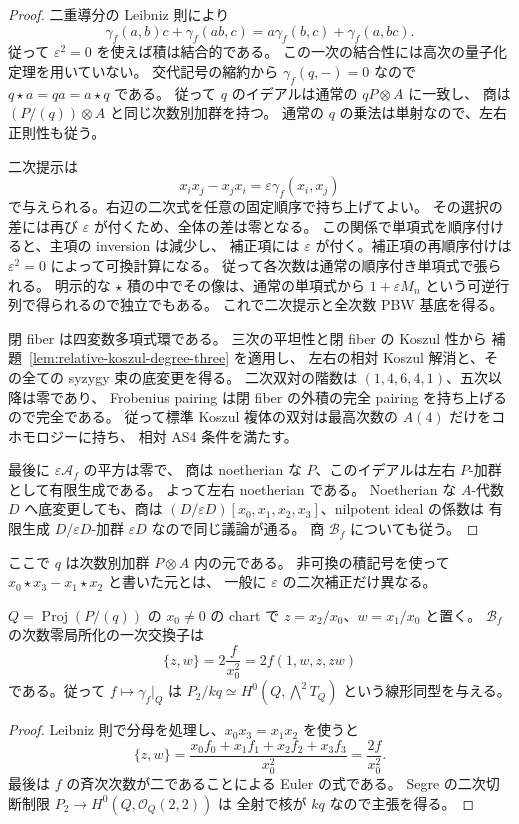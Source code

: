 \begin{proof}
二重導分の Leibniz 則により
\[
 \gamma_f(a,b)c+\gamma_f(ab,c)
 =a\gamma_f(b,c)+\gamma_f(a,bc).
\]
従って $\varepsilon^2=0$ を使えば積は結合的である。
この一次の結合性には高次の量子化定理を用いていない。
交代記号の縮約から $\gamma_f(q,-)=0$ なので
$q\star a=qa=a\star q$ である。
従って $q$ のイデアルは通常の $qP\otimes A$ に一致し、
商は $(P/(q))\otimes A$ と同じ次数別加群を持つ。
通常の $q$ の乗法は単射なので、左右正則性も従う。

二次提示は
\[
 x_ix_j-x_jx_i=\varepsilon\gamma_f(x_i,x_j)
\]
で与えられる。右辺の二次式を任意の固定順序で持ち上げてよい。
その選択の差には再び $\varepsilon$ が付くため、全体の差は零となる。
この関係で単項式を順序付けると、主項の inversion は減少し、
補正項には $\varepsilon$ が付く。補正項の再順序付けは
$\varepsilon^2=0$ によって可換計算になる。
従って各次数は通常の順序付き単項式で張られる。
明示的な $\star$ 積の中でその像は、通常の単項式から
$1+\varepsilon M_n$ という可逆行列で得られるので独立でもある。
これで二次提示と全次数 PBW 基底を得る。

閉 fiber は四変数多項式環である。
三次の平坦性と閉 fiber の Koszul 性から
補題~\ref{lem:relative-koszul-degree-three} を適用し、
左右の相対 Koszul 解消と、その全ての syzygy 束の底変更を得る。
二次双対の階数は $(1,4,6,4,1)$、五次以降は零であり、
Frobenius pairing は閉 fiber の外積の完全 pairing を持ち上げるので完全である。
従って標準 Koszul 複体の双対は最高次数の $A(4)$ だけをコホモロジーに持ち、
相対 AS4 条件を満たす。

最後に $\varepsilon\mathcal A_f$ の平方は零で、
商は noetherian な $P$、このイデアルは左右 $P$-加群として有限生成である。
よって左右 noetherian である。
Noetherian な $A$-代数 $D$ へ底変更しても、商は
$(D/\varepsilon D)[x_0,x_1,x_2,x_3]$、nilpotent ideal の係数は
有限生成 $D/\varepsilon D$-加群 $\varepsilon D$ なので同じ議論が通る。
商 $\mathcal B_f$ についても従う。
\end{proof}

ここで $q$ は次数別加群 $P\otimes A$ 内の元である。
非可換の積記号を使って $x_0\star x_3-x_1\star x_2$ と書いた元とは、
一般に $\varepsilon$ の二次補正だけ異なる。

\begin{lemma}
\label{lem:quadric-jacobian-bivectors}
$Q=\operatorname{Proj}(P/(q))$ の $x_0\ne0$ の chart で
$z=x_2/x_0$、$w=x_1/x_0$ と置く。
$\mathcal B_f$ の次数零局所化の一次交換子は
\[
 \{z,w\}=2\frac{f}{x_0^2}
        =2f(1,w,z,zw)
\]
である。従って $f\mapsto\gamma_f|_Q$ は
$P_2/kq\simeq H^0(Q,\bigwedge^2T_Q)$ という線形同型を与える。
\end{lemma}
\begin{proof}
Leibniz 則で分母を処理し、$x_0x_3=x_1x_2$ を使うと
\[
 \{z,w\}
 =\frac{x_0f_0+x_1f_1+x_2f_2+x_3f_3}{x_0^2}
 =\frac{2f}{x_0^2}.
\]
最後は $f$ の斉次次数が二であることによる Euler の式である。
Segre の二次切断制限 $P_2\to H^0(Q,\mathcal O_Q(2,2))$ は
全射で核が $kq$ なので主張を得る。
\end{proof}

